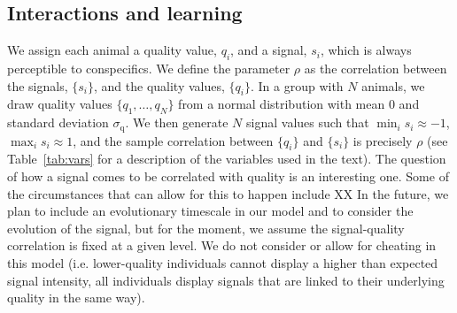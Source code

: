 \subsection{Interactions and learning }
We assign each animal a quality value, $q_i$, and a signal, $s_i$, which is always perceptible to conspecifics. We define the parameter $\rho$ as the correlation between the signals, $\{s_i\}$, and the quality values, $\{q_i\}$. In a group with $N$ animals, we draw quality values $\{q_1,\dots,q_N\}$ from a normal distribution with mean $0$ and standard deviation $\sigma_\text{q}$. We then generate $N$ signal values such that $\min_i{s_i}\approx -1$, $\max_i{s_i}\approx 1$, and the sample correlation between $\{q_i\}$ and $\{s_i\}$ is precisely $\rho$ (see Table~\ref{tab:vars} for a description of the variables used in the text). The question of how a signal comes to be correlated with quality is an interesting one. Some of the circumstances that can allow for this to happen include XX In the future, we plan to include an evolutionary timescale in our model and to consider the evolution of the signal, but for the moment, we assume the signal-quality correlation is fixed at a given level.
We do not consider or allow for cheating in this model (i.e. lower-quality individuals cannot display a higher than expected signal intensity, all individuals display signals that are linked to their underlying quality in the same way).
  
